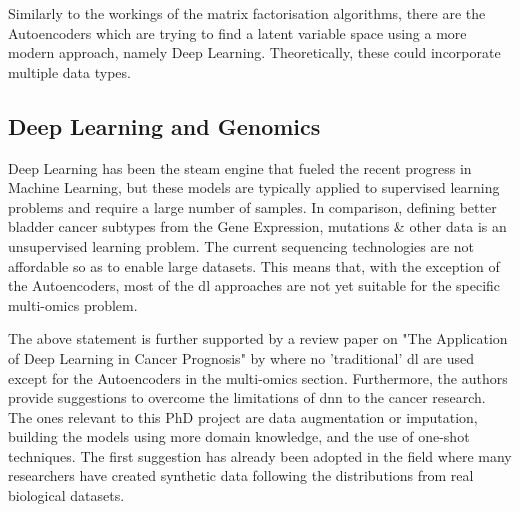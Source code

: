 Similarly to the workings of the matrix factorisation algorithms, there are the Autoencoders which are trying to find a latent variable space using a more modern approach, namely Deep Learning. Theoretically, these could incorporate multiple data types.

\subsection{Deep Learning  and Genomics} \label{s:lit:dl_genomics}

\vspace{3mm}
\vspace{3mm}

Deep Learning has been the steam engine that fueled the recent progress in Machine Learning, but these models are typically applied to supervised learning problems and require a large number of samples. In comparison, defining better bladder cancer subtypes from the Gene Expression, mutations \& other data is an unsupervised learning problem. The current sequencing technologies are not affordable so as to enable large datasets. This means that, with the exception of the Autoencoders, most of the \acrshort{dl} approaches are not yet suitable for the specific multi-omics problem.

The above statement is further supported by a review paper on "The Application of Deep Learning in Cancer Prognosis" by \citet{Zhu2020-cv} where no 'traditional' \acrshort{dl} are used except for the Autoencoders in the multi-omics section. Furthermore, the authors provide suggestions to overcome the limitations of \acrshort{dnn} to the cancer research. The ones relevant to this PhD project are data augmentation or imputation, building the models using more domain knowledge, and the use of one-shot techniques. The first suggestion has already been adopted in the field where many researchers have created synthetic data \cite{Zhao2012-wj,Leiserson2015-yk} following the distributions from real biological datasets.

